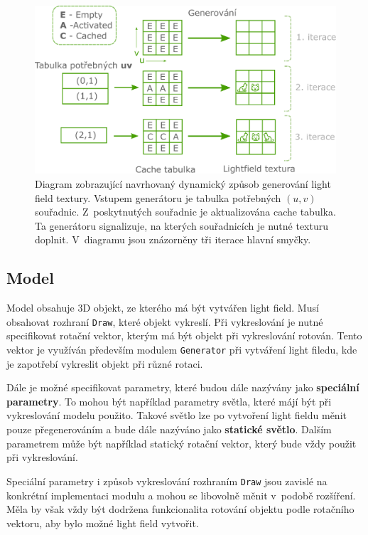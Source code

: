 \begin{figure}[H]
	\centering
		\includegraphics[width=1.0\textwidth]{obrazky-figures/lfdiagram_fixed.pdf}
	\caption{Diagram zobrazující navrhovaný dynamický způsob generování light field textury. Vstupem generátoru je tabulka potřebných ${(u,v)}$ souřadnic. Z~poskytnutých souřadnic je aktualizována cache tabulka. Ta generátoru signalizuje, na kterých souřadnicích je nutné texturu doplnit. V~diagramu jsou znázorněny tři iterace hlavní smyčky.}
	\label{fig:lftabulka}
\end{figure}


\subsection*{Model} Model obsahuje 3D objekt, ze kterého má být vytvářen light field. Musí obsahovat rozhraní \texttt{Draw}, které objekt vykreslí. Při vykreslování je nutné specifikovat rotační vektor, kterým má být objekt při vykreslování rotován. Tento vektor je využíván především modulem \texttt{Generator} při vytváření light filedu, kde je zapotřebí vykreslit objekt při různé rotaci. 

Dále je možné specifikovat parametry, které budou dále nazývány jako \textbf{speciální parametry}. To mohou být například parametry světla, které májí být při vykreslování modelu použito. Takové světlo lze po vytvoření light fieldu měnit pouze přegenerováním a bude dále nazýváno jako \textbf{statické světlo}. Dalším parametrem může být například statický rotační vektor, který bude vždy použit při vykreslování. 

Speciální parametry i způsob vykreslování rozhraním \texttt{Draw} jsou zavislé na konkrétní implementaci modulu a mohou se libovolně měnit v~podobě rozšíření. Měla by však vždy být dodržena funkcionalita rotování objektu podle rotačního vektoru, aby bylo možné light field vytvořit. 

